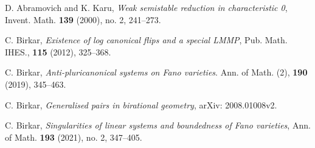 \documentclass[11pt]{amsart}
\numberwithin{equation}{section}
\theoremstyle{definition}
\theoremstyle{definition}
\theoremstyle{definition}
\begin{document}
\begin{thebibliography}{99}

 D. Abramovich and K. Karu, \textit{Weak semistable reduction in characteristic 0}, Invent. Math. \textbf{139} (2000), no. 2, 241--273.




 C. Birkar, \textit{Existence of log canonical flips and a special LMMP}, Pub. Math. IHES., \textbf{115} (2012), 325--368.




	
 C. Birkar, \textit{Anti-pluricanonical systems on Fano varieties}. Ann. of Math. (2), \textbf{190} (2019), 345--463.
	

 C. Birkar, \textit{Generalised pairs in birational geometry}, arXiv: 2008.01008v2.


 C. Birkar, \textit{Singularities of linear systems and boundedness of Fano varieties}, Ann. of Math. \textbf{193} (2021), no. 2, 347--405.




\end{thebibliography}
\end{document}
